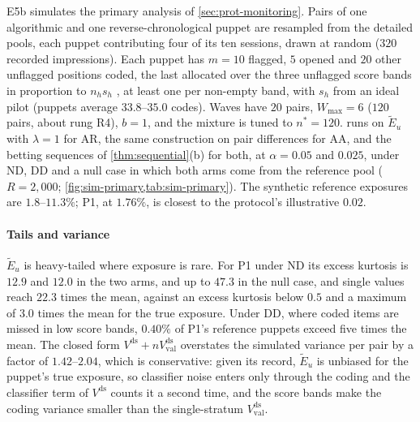 E5b simulates the primary analysis of \cref{sec:prot-monitoring}. Pairs of one algorithmic and one reverse-chronological puppet are resampled from the detailed pools, each puppet contributing four of its ten sessions, drawn at random ($320$ recorded impressions). Each puppet has $m=10$ flagged, $5$ opened and $20$ other unflagged positions coded, the last allocated over the three unflagged score bands in proportion to $n_hs_h$ \citep{neyman1934}, at least one per non-empty band, with $s_h$ from an ideal pilot (puppets average $33.8$--$35.0$ codes). Waves have $20$ pairs, $W_{\max}=6$ ($120$ pairs, about rung R4), $b=1$, and the mixture is tuned to $n^\ast=120$.  runs on $\widetilde E_u$ with $\lambda=1$ for $\mathrm{AR}$, the same construction on pair differences for $\mathrm{AA}$, and the betting sequences of \cref{thm:sequential}(b) for both, at $\alpha=0.05$ and $0.025$, under ND, DD and a null case in which both arms come from the reference pool ($R=2{,}000$; \cref{fig:sim-primary,tab:sim-primary}). The synthetic reference exposures are $1.8$--$11.3\%$; P1, at $1.76\%$, is closest to the protocol's illustrative $0.02$.

\paragraph{Tails and variance} $\widetilde E_u$ is heavy-tailed where exposure is rare. For P1 under ND its excess kurtosis is $12.9$ and $12.0$ in the two arms, and up to $47.3$ in the null case, and single values reach $22.3$ times the mean, against an excess kurtosis below $0.5$ and a maximum of $3.0$ times the mean for the true exposure. Under DD, where coded items are missed in low score bands, $0.40\%$ of P1's reference puppets exceed five times the mean. The closed form $V^{\mathrm{ds}}+nV^{\mathrm{ds}}_{\mathrm{val}}$ overstates the simulated variance per pair by a factor of $1.42$--$2.04$, which is conservative: given its record, $\widetilde E_u$ is unbiased for the puppet's true exposure, so classifier noise enters only through the coding and the classifier term of $V^{\mathrm{ds}}$ counts it a second time, and the score bands make the coding variance smaller than the single-stratum $V^{\mathrm{ds}}_{\mathrm{val}}$.

